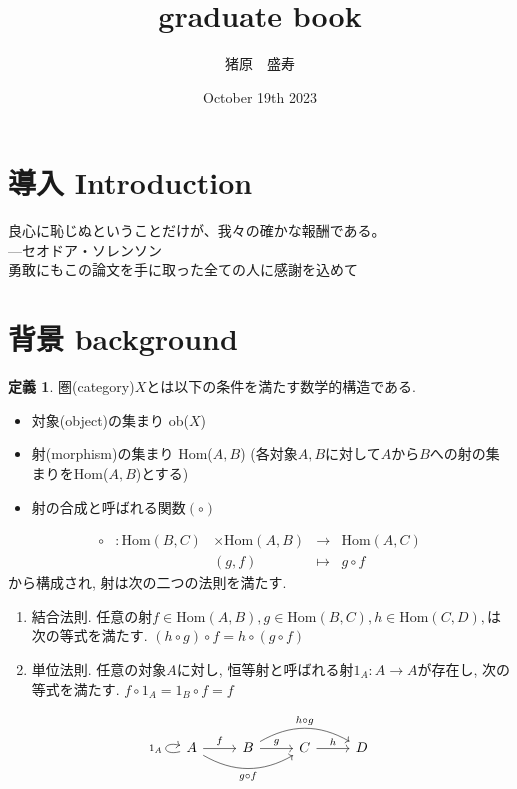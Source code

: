 \documentclass[a4paper]{jsarticle}
\title{graduate book}
\author{猪原　盛寿}
\date{October 19th 2023}
\theoremstyle{definition}
\newtheorem{dfn}{定義}[section]
\newcommand{\Hom}{{\mathrm{Hom}}}
\begin{document}
\Large
\maketitle

\section{導入 Introduction}
良心に恥じぬということだけが、我々の確かな報酬である。\\
---セオドア・ソレンソン\\
勇敢にもこの論文を手に取った全ての人に感謝を込めて
\section{背景 background}

\begin{dfn}
圏(category)$X$とは以下の条件を満たす数学的構造である. 
\begin{itemize}
    \item 対象(object)の集まり ob($X$)
    \item 射(morphism)の集まり Hom($A,B$)
    (各対象$A, B$に対して$A$から$B$への射の集まりをHom($A, B$)とする)
    \item 射の合成と呼ばれる関数$(\circ)$
\end{itemize}
\begin{equation}
    \begin{array}{lllll}
     \circ &: \Hom (B, C) &\times \Hom (A, B) &\rightarrow &\Hom (A, C)  \\
         &    & (g,f) & \mapsto&  g\circ f
\end{array}
\end{equation}
から構成され, 射は次の二つの法則を満たす.
\begin{enumerate}[(1)]
    \item 結合法則. 任意の射$f\in \Hom(A,B), g\in \Hom(B,C), h\in \Hom(C,D),$は次の等式を満たす. $(h \circ g) \circ f = h \circ (g \circ f)$  
    \item 単位法則. 任意の対象$A$に対し, 恒等射と呼ばれる射$1_A:A\rightarrow A$が存在し, 次の等式を満たす.  $f\circ 1_A = 1_B\circ f = f$  
\end{enumerate}
\begin{equation}
    \begin{tikzcd}
    A\ar{r}{f} \ar[loop left,"1_A"] \ar[bend right=30,swap]{rr}{g\circ f}& B\ar{r}{g} \ar[bend left=30]{rr}{h\circ g}& C\ar{r}{h} & D
\end{tikzcd}
\end{equation}
\end{dfn}
\end{document}
